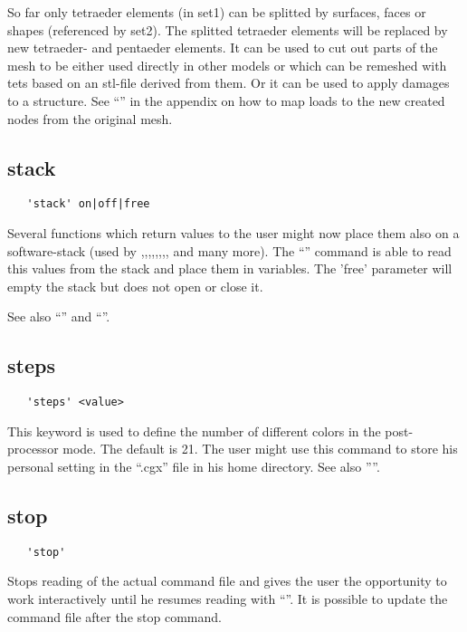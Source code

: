 \documentclass{article}
\begin{document}
So far only tetraeder elements (in set1) can be splitted by surfaces, faces or shapes (referenced by set2). The splitted tetraeder elements will be replaced by new tetraeder- and pentaeder elements. It can be used to cut out parts of the mesh to be either used directly in other models or which can be remeshed with tets based on an stl-file derived from them. Or it can be used to apply damages to a structure. See ``'' in the appendix on how to map loads to the new created nodes from the original mesh.

\subsection{\label{stack}stack}
\begin{verbatim}
   'stack' on|off|free
\end{verbatim}
Several functions which return values to the user might now place them also on a software-stack (used by ,,,,,,,, and many more). The ``'' command is able to read this values from the stack and place them in variables. The 'free' parameter will empty the stack but does not open or close it.

See also ``'' and ``''.

\subsection{\label{steps}steps}
\begin{verbatim}
   'steps' <value> 
\end{verbatim}
This keyword is used to define the number of different colors in the post-processor mode. The default is 21. The user might use this command to store his personal setting in the ``.cgx'' file in his home directory. See also ''''.

\subsection{\label{stop}stop}
\begin{verbatim}
   'stop'
\end{verbatim}
Stops reading of the actual command file and gives the user the opportunity to work interactively until he resumes reading with ``''. It is possible to update the command file after the stop command.
\end{document}
